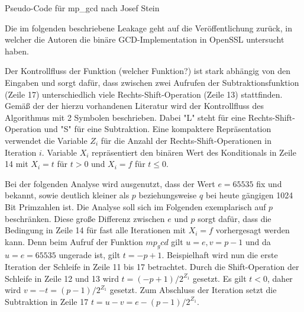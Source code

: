 \begin{algorithm}[h]
\DontPrintSemicolon
\caption{Pseudo-Code für mp_gcd nach Josef Stein}
\label{alg:mp_gcd}

\end{algorithm}

Die im folgenden beschriebene Leakage geht auf die Veröffentlichung \cite{RSAKeyGeneration2} zurück, in welcher die Autoren die binäre GCD-Implementation in OpenSSL untersucht haben.

Der Kontrollfluss der Funktion (welcher Funktion?) ist stark abhängig von den Eingaben und sorgt dafür, dass zwischen zwei Aufrufen der Subtraktionsfunktion (Zeile 17) unterschiedlich viele Rechts-Shift-Operation (Zeile 13) stattfinden.
Gemäß der der hierzu vorhandenen Literatur wird der Kontrollfluss des Algorithmus mit 2 Symbolen beschrieben.
Dabei "L" steht für eine Rechts-Shift-Operation und "S" für eine Subtraktion.
Eine kompaktere Repräsentation verwendet die Variable $Z_i$ für die Anzahl der Rechts-Shift-Operationen in Iteration $i$.
Variable $X_i$ repräsentiert den binären Wert des Konditionals in Zeile 14 mit $X_i=t$ für $t>0$ und $X_i = f$ für $t \leq 0$.

Bei der folgenden Analyse wird ausgenutzt, dass der Wert $e=65535$ fix und bekannt, sowie deutlich kleiner als $p$ beziehungsweise $q$ bei heute gängigen 1024 Bit Primzahlen ist.
Die Analyse soll sich im Folgenden exemplarisch auf $p$ beschränken.
Diese große Differenz zwischen $e$ und $p$ sorgt dafür, dass die Bedingung in Zeile 14 für fast alle Iterationen mit $X_i = f$ vorhergesagt werden kann.
Denn beim Aufruf der Funktion $mp_gcd$ gilt $u=e, v=p-1$ und da $u=e=65535$ ungerade ist, gilt $t=-p+1$.
Beispielhaft wird nun die erste Iteration der Schleife in Zeile 11 bis 17 betrachtet.
Durch die Shift-Operation der Schleife in Zeile 12 und 13 wird $t=(-p+1)/2^{Z_1}$ gesetzt.
Es gilt $t<0$, daher wird $v=-t=(p-1)/2^{Z_1}$ gesetzt. 
Zum Abschluss der Iteration setzt die Subtraktion in Zeile 17 $t=u-v=e-(p-1)/2^{Z_1}$.

